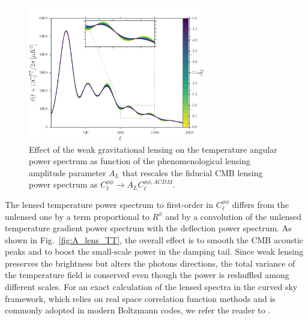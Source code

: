 \begin{figure}[t] %
\centering %
\includegraphics[width=0.7\textwidth]{Chapter1/Images/A_L_cltt_2}
\caption{Effect of the weak gravitational lensing on the temperature angular power spectrum as function of the phenomenological lensing amplitude parameter $A_L$ that rescales the fiducial \gls{CMB} lensing power spectrum as $C_{\ell}^{\phi\phi} \to A_L C_{\ell}^{\phi\phi, \Lambda CDM}$. \label{fig:A_lens_TT}}
\end{figure}

The lensed temperature power spectrum to first-order in $C_{\ell}^{\phi\phi}$ differs from the unlensed one
by a term proportional to $R^{\phi}$ and by a convolution of the unlensed temperature gradient power 
spectrum with the deflection power spectrum. As shown in Fig.~\eqref{fig:A_lens_TT}, the overall effect is to smooth the \gls{CMB} acoustic peaks and 
to boost the small-scale power in the damping tail. Since weak lensing preserves the brightness but alters
the photons directions, the total variance of the temperature field is conserved even though the power is
reshuffled among different scales. For an exact calculation of the lensed spectra in the curved sky 
framework, which relies on real space correlation function methods and is commonly adopted in modern Boltzmann codes, we refer the reader to \cite{Challinor2002,Challinor2005}. 

